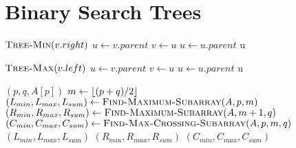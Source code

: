 \documentclass[10pt, letterpaper]{article}
\begin{document}
\section{Binary Search Trees}
\begin{minipage}{\linewidth}
  \begin{algorithm}[H]
    \begin{algorithmic}[1]
          \State \Return $\textsc{Tree-Min}(v.right)$
        \EndIf
        \State $u \gets v.parent$
          \State $v \gets u$
          \State $u \gets u.parent$
        \EndWhile
        \State \Return u
      \EndProcedure
    \end{algorithmic}
  \end{algorithm}
\end{minipage}
\begin{minipage}{\linewidth}
  \begin{algorithm}[H]
    \begin{algorithmic}[1]
          \State \Return $\textsc{Tree-Max}(v.left)$
        \EndIf
        \State $u \gets v.parent$
          \State $v \gets u$
          \State $u \gets u.parent$
        \EndWhile
        \State \Return u
      \EndProcedure
    \end{algorithmic}
  \end{algorithm}
\end{minipage}
\begin{minipage}{\linewidth}
  \begin{algorithm}[H]
    \begin{algorithmic}[1]
          \State \Return $(p, q, A[p])$
        \EndIf
        \State $m \gets \lfloor (p + q) / 2 \rfloor$
        \State $(L_{min}, L_{max}, L_{sum}) \gets \textsc{Find-Maximum-Subarray}(A, p, m)$
        \State $(R_{min}, R_{max}, R_{sum}) \gets \textsc{Find-Maximum-Subarray}(A, m+1, q)$
        \State $(C_{min}, C_{max}, C_{sum}) \gets \textsc{Find-Max-Crossing-Subarray}(A, p, m, q)$
          \State \Return $(L_{min}, L_{max}, L_{sum})$
          \State \Return $(R_{min}, R_{max}, R_{sum})$
        \Else
          \State \Return $(C_{min}, C_{max}, C_{sum})$
        \EndIf
      \EndProcedure
    \end{algorithmic}
  \end{algorithm}
\end{minipage}
\end{document}

